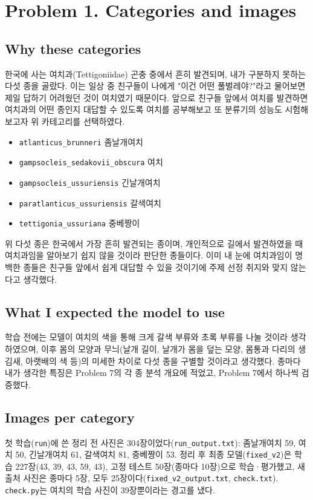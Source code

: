 \documentclass[11pt]{article}
\begin{document}
\makeheader

\section*{Problem 1. Categories and images}

\subsection*{Why these categories}
한국에 사는 여치과(Tettigoniidae) 곤충 중에서 흔히 발견되며, 내가 구분하지 못하는 다섯 종을 골랐다. 이는 일상 중 친구들이 나에게 "이건 어떤 풀벌레야?"라고 물어보면 제일 답하기 어려웠던 것이 여치였기 때문이다. 앞으로 친구들 앞에서 여치를 발견하면 여치과의 어떤 종인지 대답할 수 있도록 여치를 공부해보고 또 분류기의 성능도 시험해보고자 위 카테고리를 선택하였다. 
\begin{itemize}
\item \texttt{atlanticus\_brunneri} 좀날개여치
\item \texttt{gampsocleis\_sedakovii\_obscura} 여치
\item \texttt{gampsocleis\_ussuriensis} 긴날개여치
\item \texttt{paratlanticus\_ussuriensis} 갈색여치
\item \texttt{tettigonia\_ussuriana} 중베짱이
\end{itemize}
위 다섯 종은 한국에서 가장 흔히 발견되는 종이며, 개인적으로 길에서 발견하였을 때 여치과임을 알아보기 쉽지 않을 것이라 판단한 종들이다. 이미 내 눈에 여치과임이 명백한 종들은 친구들 앞에서 쉽게 대답할 수 있을 것이기에 주제 선정 취지와 맞지 않는다고 생각했다.

\subsection*{What I expected the model to use}
학습 전에는 모델이 여치의 색을 통해 크게 갈색 부류와 초록 부류를 나눌 것이라 생각하였으며, 이후 몸의 모양과 무늬(날개 길이, 날개가 몸을 덮는 모양, 몸통과 다리의 생김새, 아랫배의 색 등)의 미세한 차이로 다섯 종을 구별할 것이라고 생각했다. 종마다 내가 생각한 특징은 Problem 7의 각 종 분석 개요에 적었고, Problem 7에서 하나씩 검증했다.

\subsection*{Images per category}
첫 학습(\texttt{run})에 쓴 정리 전 사진은 304장이었다(\texttt{run\_output.txt}): 좀날개여치 59, 여치 50, 긴날개여치 61, 갈색여치 81, 중베짱이 53. 정리 후 최종 모델(\texttt{fixed\_v2})은 학습 227장(43, 39, 43, 59, 43), 고정 테스트 50장(종마다 10장)으로 학습·평가했고, 새 출처 사진은 종마다 5장, 모두 25장이다(\texttt{fixed\_v2\_output.txt}, \texttt{check.txt}). \texttt{check.py}는 여치의 학습 사진이 39장뿐이라는 경고를 냈다.
\end{document}
